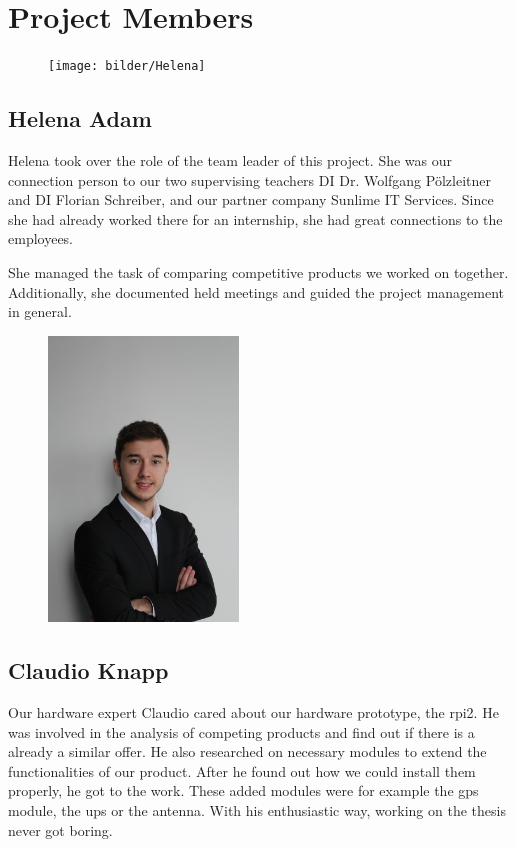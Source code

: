 \chapter*{Project Members}
\begin{figure}
    \texttt{[image: bilder/Helena]}
\end{figure}
\section*{Helena Adam}
Helena took over the role of the team leader of this project. She was our connection person to our two supervising teachers DI Dr. Wolfgang Pölzleitner and DI Florian Schreiber, and our partner company Sunlime IT Services. Since she had already worked there for an internship, she had great connections to the employees.

She managed the task of comparing competitive products we worked on together. Additionally, she documented held meetings and guided the project management in general.
\begin{figure}
	\includegraphics[width=0.45\textwidth, angle =-90]{bilder/Claudio}
\end{figure}
\section*{Claudio Knapp}
Our hardware expert Claudio cared about our hardware prototype, the \gls{rpi2}. He was involved in the analysis of competing products and find out if there is a already a similar offer. He also researched on necessary modules to extend the functionalities of our product. After he found out how we could install them properly, he got to the work. These added modules were for example the \gls{gps} module, the \gls{ups} or the antenna. With his enthusiastic way, working on the thesis never got boring. 

